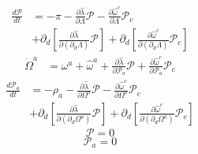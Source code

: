 \documentclass{article}
\begin{document}
\begin{align*}
\frac{ d \mathscr{P}}{dt} & = -\pi - \frac{\partial {\hat \lambda}}{\partial \Lambda}\mathscr{P} - \frac{\partial {\hat \omega}^{c}}{\partial \Lambda}\mathscr{P}_{c}\\
& + \partial_{d}[\frac{\partial {\hat \lambda}}{\partial(\partial_{d}\Lambda)}\mathscr{P}] + \partial_{d}[\frac{\partial {\hat \omega^{c}}}{\partial(\partial_{d}\Lambda)}\mathscr{P}_{c}] 
\end{align*}
\begin{align*}
{\dot \Omega}^{a} & = \omega^{a} + {\hat \omega^{a}} + \frac{\partial {\hat \lambda}}{\partial \mathscr{P}_{a}}\mathscr{P} + \frac{\partial {\hat \omega}^{c}}{\partial \mathscr{P}_{a}}\mathscr{P}_{c}
\end{align*}
\begin{align*}
\frac{d \mathscr{P}_{a}}{dt} & = -\rho_{a} -  \frac{\partial {\hat \lambda}}{\partial \Omega^{a}}\mathscr{P} - \frac{\partial {\hat \omega}^{c}}{\partial \Omega^{a}}\mathscr{P}_{c}\\
& + \partial_{d}[\frac{\partial {\hat \lambda}}{\partial(\partial_{d}\Omega^{a})}\mathscr{P}] + \partial_{d}[\frac{\partial {\hat \omega^{c}}}{\partial(\partial_{d}\Omega^{a})}\mathscr{P}_{c}] 
\end{align*}
\[
\mathscr{P}  = 0
\]
\[
\mathscr{P}_{a} = 0
\]
\end{document}
